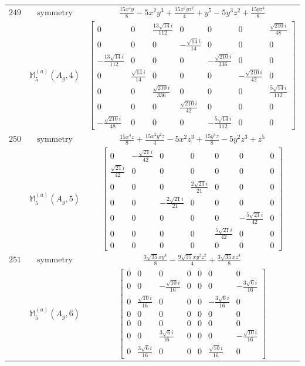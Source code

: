 \documentclass[fleqn,8pt,landscape]{jsarticle}
\begin{document}
\begin{longtable}{ccc}
$ 249 $ & $ \text{symmetry} $ & $ \frac{15 x^{4} y}{8} - 5 x^{2} y^{3} + \frac{15 x^{2} y z^{2}}{4} + y^{5} - 5 y^{3} z^{2} + \frac{15 y z^{4}}{8} $ \\
$  $ & $ \mathbb{M}_{5}^{(a)}(A_{g},4) $ & $ \begin{bmatrix} 0 & 0 & \frac{13 \sqrt{14} i}{112} & 0 & 0 & 0 & \frac{\sqrt{210} i}{48} \\ 0 & 0 & 0 & - \frac{\sqrt{14} i}{14} & 0 & 0 & 0 \\ - \frac{13 \sqrt{14} i}{112} & 0 & 0 & 0 & - \frac{\sqrt{210} i}{336} & 0 & 0 \\ 0 & \frac{\sqrt{14} i}{14} & 0 & 0 & 0 & - \frac{\sqrt{210} i}{42} & 0 \\ 0 & 0 & \frac{\sqrt{210} i}{336} & 0 & 0 & 0 & \frac{5 \sqrt{14} i}{112} \\ 0 & 0 & 0 & \frac{\sqrt{210} i}{42} & 0 & 0 & 0 \\ - \frac{\sqrt{210} i}{48} & 0 & 0 & 0 & - \frac{5 \sqrt{14} i}{112} & 0 & 0 \end{bmatrix} $ \\ \hline
$ 250 $ & $ \text{symmetry} $ & $ \frac{15 x^{4} z}{8} + \frac{15 x^{2} y^{2} z}{4} - 5 x^{2} z^{3} + \frac{15 y^{4} z}{8} - 5 y^{2} z^{3} + z^{5} $ \\
$  $ & $ \mathbb{M}_{5}^{(a)}(A_{g},5) $ & $ \begin{bmatrix} 0 & - \frac{\sqrt{21} i}{42} & 0 & 0 & 0 & 0 & 0 \\ \frac{\sqrt{21} i}{42} & 0 & 0 & 0 & 0 & 0 & 0 \\ 0 & 0 & 0 & \frac{2 \sqrt{21} i}{21} & 0 & 0 & 0 \\ 0 & 0 & - \frac{2 \sqrt{21} i}{21} & 0 & 0 & 0 & 0 \\ 0 & 0 & 0 & 0 & 0 & - \frac{5 \sqrt{21} i}{42} & 0 \\ 0 & 0 & 0 & 0 & \frac{5 \sqrt{21} i}{42} & 0 & 0 \\ 0 & 0 & 0 & 0 & 0 & 0 & 0 \end{bmatrix} $ \\ \hline
$ 251 $ & $ \text{symmetry} $ & $ \frac{3 \sqrt{35} x y^{4}}{8} - \frac{9 \sqrt{35} x y^{2} z^{2}}{4} + \frac{3 \sqrt{35} x z^{4}}{8} $ \\
$  $ & $ \mathbb{M}_{5}^{(a)}(A_{g},6) $ & $ \begin{bmatrix} 0 & 0 & 0 & 0 & 0 & 0 & 0 \\ 0 & 0 & - \frac{\sqrt{10} i}{16} & 0 & 0 & 0 & - \frac{3 \sqrt{6} i}{16} \\ 0 & \frac{\sqrt{10} i}{16} & 0 & 0 & 0 & - \frac{3 \sqrt{6} i}{16} & 0 \\ 0 & 0 & 0 & 0 & 0 & 0 & 0 \\ 0 & 0 & 0 & 0 & 0 & 0 & 0 \\ 0 & 0 & \frac{3 \sqrt{6} i}{16} & 0 & 0 & 0 & - \frac{\sqrt{10} i}{16} \\ 0 & \frac{3 \sqrt{6} i}{16} & 0 & 0 & 0 & \frac{\sqrt{10} i}{16} & 0 \end{bmatrix} $ \\ \hline

\end{longtable}
\end{document}
